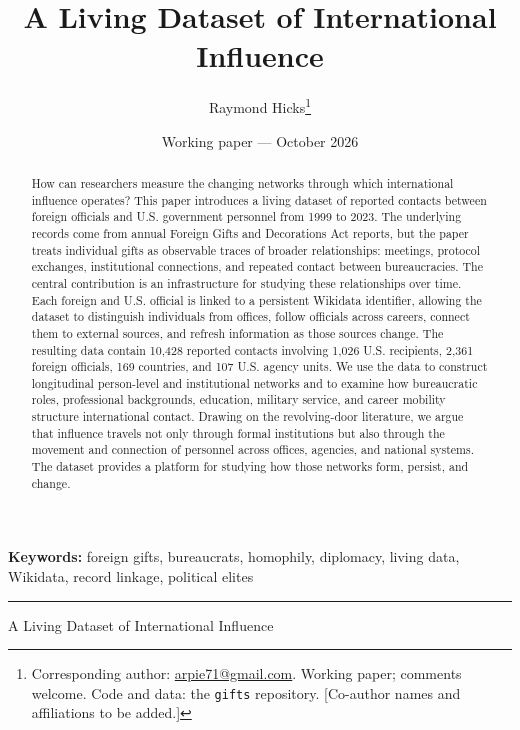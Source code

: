 \documentclass[11pt]{article}
\title{\textbf{A Living Dataset of International Influence}}
\author{Raymond Hicks\thanks{Corresponding author: \href{mailto:arpie71@gmail.com}{arpie71@gmail.com}. Working paper; comments welcome. Code and data: the \texttt{gifts} repository. [Co-author names and affiliations to be added.]}}
\date{Working paper --- October 2026}
\makeatletter
\renewcommand\section{\@startsection{section}{1}{\z@}{-3.0ex plus -1ex minus -.2ex}{1.5ex plus .2ex}{\normalfont\large\bfseries\MakeUppercase}}
\makeatother
\begin{document}
\maketitle

\begin{abstract}
\noindent How can researchers measure the changing networks through which international influence operates? This paper introduces a living dataset of reported contacts between foreign officials and U.S. government personnel from 1999 to 2023. The underlying records come from annual Foreign Gifts and Decorations Act reports, but the paper treats individual gifts as observable traces of broader relationships: meetings, protocol exchanges, institutional connections, and repeated contact between bureaucracies. The central contribution is an infrastructure for studying these relationships over time. Each foreign and U.S. official is linked to a persistent Wikidata identifier, allowing the dataset to distinguish individuals from offices, follow officials across careers, connect them to external sources, and refresh information as those sources change. The resulting data contain 10,428 reported contacts involving 1,026 U.S. recipients, 2,361 foreign officials, 169 countries, and 107 U.S. agency units. We use the data to construct longitudinal person-level and institutional networks and to examine how bureaucratic roles, professional backgrounds, education, military service, and career mobility structure international contact. Drawing on the revolving-door literature, we argue that influence travels not only through formal institutions but also through the movement and connection of personnel across offices, agencies, and national systems. The dataset provides a platform for studying how those networks form, persist, and change.
\end{abstract}

\medskip
\noindent\textbf{Keywords:} foreign gifts, bureaucrats, homophily, diplomacy, living data, Wikidata, record linkage, political elites

\vspace{1em}
\hrule
\vspace{1em}

\section{Introduction}


A Living Dataset of International Influence
\end{document}
